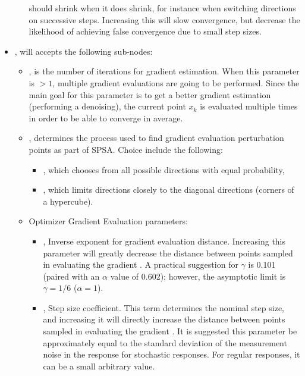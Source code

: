\begin{itemize}
\begin{itemize}
    should shrink when it does shrink, for instance when switching directions on successive steps.  Increasing
    this will slow convergence, but decrease the likelihood of achieving false convergence due to small step
    sizes.
  \end{itemize}
\item {},  will accepts the following sub-nodes:
  \begin{itemize}
  \item {},  is the number of iterations for gradient estimation. When this
        parameter is $>1$, multiple gradient evaluations are going to be performed. Since the main goal for this parameter is to
        get a better gradient estimation (performing a denoising), the current point $x_k$ is evaluated multiple times in order to be able to
        converge in average.

  \item {},  determines the process used to find
        gradient evaluation perturbation points as part of SPSA. Choice include the following:
        \begin{itemize}
          \item {}, which chooses from all possible directions with equal probability,
          \item {}, which limits directions closely to the diagonal directions (corners of
                                       a hypercube).
        \end{itemize}

  \item Optimizer Gradient Evaluation parameters:
    \begin{itemize}
      \item {},  Inverse exponent for gradient evaluation distance. Increasing this
        parameter will greatly decrease the distance between points sampled in evaluating the gradient
        \cite{spall1998implementation}. A practical suggestion for $\gamma$ is 0.101 (paired with an
        $\alpha$ value of 0.602); however, the asymptotic limit is $\gamma=1/6$ ($\alpha=1$). 
      \item {},  Step size coefficient.  This term determines the
        nominal step size, and increasing it will directly increase the distance between points sampled in evaluating the gradient
        \cite{spall1998implementation}. It is suggested this parameter be approximately equal to the standard
        deviation of the measurement noise in the response for stochastic responses.  For regular responses,
        it can be a small arbitrary value. 
    \end{itemize}


\end{itemize}
\end{itemize}
